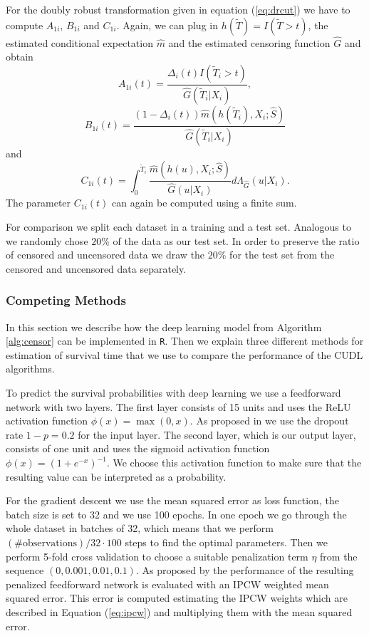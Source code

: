 \documentclass[12pt, a4paper]{scrartcl}
\theoremstyle{definition}
\theoremstyle{plain}
\numberwithin{equation}{section}
\numberwithin{figure}{section}
\numberwithin{table}{section}
\begin{document}
	For the doubly robust transformation given in equation (\ref{eq:drcut}) we have to compute $A_{1i}$, $B_{1i}$ and $C_{1i}$.
	Again, we can plug in $h(\tilde T)=I(\tilde T>t)$, the estimated conditional expectation $\hat{m}$ and the estimated censoring function $\hat{G}$ and obtain
	\begin{equation*}
		A_{1i}(t)=\frac{\Delta_i(t)I(\tilde{T}_i >t)}{\hat{G}(\tilde{T}_i\vert X_i)},
	\end{equation*}
	\begin{equation*}
		B_{1i}(t) = \frac{(1-\Delta_i(t))\hat{m}(h(\tilde{T}_i), X_i; \hat{S})}{\hat{G}(\tilde{T}_i \vert X_i)}
	\end{equation*}
	and
	\begin{equation*}
	C_{1i}(t) = \int_{0}^{\tilde T_i}\frac{\hat{m}(h(u), X_i; \hat{S})}{\hat{G}(u\vert X_i)}d\Lambda_{\hat{G}}(u \vert X_i).
	\end{equation*}
	The parameter $C_{1i}(t)$ can again be computed using a finite sum.
	
	For comparison we split each dataset in a training and a test set.
	Analogous to \citet*{basearticle} we randomly chose $20\%$ of the data as our test set.
	In order to preserve the ratio of censored and uncensored data we draw the $20\%$ for the test set from the censored and uncensored data separately.
	
	\subsubsection{Competing Methods}\label{comp}
	
	In this section we describe how the deep learning model from Algorithm \ref{alg:censor} can be implemented in \texttt{R}.
	Then we explain three different methods for estimation of survival time that we use to compare the performance of the CUDL algorithms.
	
	To predict the survival probabilities with deep learning we use a feedforward network with two layers.
	The first layer consists of 15 units and uses the ReLU activation function $\phi(x) = \max(0, x)$.
	As proposed in \citet*{deeplbook} we use the dropout rate $1-p=0.2$ for the input layer.
	The second layer, which is our output layer, consists of one unit and uses the sigmoid activation function $\phi(x)=(1+e^{-x})^{-1}$.
	We choose this activation function to make sure that the resulting value can be interpreted as a probability.
	
	For the gradient descent we use the mean squared error as loss function, the batch size is set to 32 and we use 100 epochs.
	In one epoch we go through the whole dataset in batches of 32, which means that we perform  $(\# \text{observations})/32\cdot100$ steps to find the optimal parameters.
	Then we perform 5-fold cross validation to choose a suitable penalization term $\eta$ from the sequence $(0, 0.001, 0.01, 0.1)$.
	As proposed by \citet*{basearticle} the performance of the resulting penalized feedforward network is evaluated with an IPCW weighted mean squared error.
	This error is computed estimating the IPCW weights which are described in Equation (\ref{eq:ipcw}) and multiplying them with the mean squared error.
	
\end{document}

